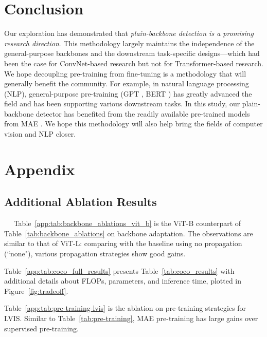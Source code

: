 \documentclass[runningheads]{llncs}
\begin{document}
\section{Conclusion}

Our exploration has demonstrated that \textit{plain-backbone detection is a promising research direction}. This methodology largely maintains the independence of the general-purpose backbones and the downstream task-specific designs---which had been the case for ConvNet-based research but not for Transformer-based research. We hope decoupling pre-training from fine-tuning is a methodology that will generally benefit the community. For example, in natural language processing (NLP), general-purpose pre-training (GPT \cite{Radford2018}, BERT \cite{Devlin2019}) has greatly advanced the field and has been supporting various downstream tasks. In this study, our plain-backbone detector has benefited from the readily available pre-trained models from MAE \cite{He2021}. We hope this methodology will also help bring the fields of computer vision and NLP closer.

\clearpage

\appendix

\section{Appendix}

\newcommand{\lr}{\emph{lr}\xspace}
\newcommand{\wtd}{\emph{wd}\xspace}
\newcommand{\drp}{\emph{dp}\xspace}
\newcommand{\expnum}[2]{{#1}\mathrm{e}^{#2}}


\renewcommand{\citeapp}{\cite}


\subsection{Additional Ablation Results}\label{app:sec:results}

~~
Table~\ref{app:tab:backbone_ablations_vit_b} is the ViT-B counterpart of Table~\ref{tab:backbone_ablations} on backbone adaptation. The observations are similar to that of ViT-L: comparing with the baseline using no propagation (``none"), various propagation strategies show good gains.

Table~\ref{app:tab:coco_full_results} presents Table~\ref{tab:coco_results} with additional details about FLOPs, parameters, and inference time, plotted in Figure~\ref{fig:tradeoff}.

Table~\ref{app:tab:pre-training-lvis} is the ablation on pre-training strategies for LVIS. Similar to Table~\ref{tab:pre-training}, MAE pre-training has large gains over supervised pre-training.
\end{document}
